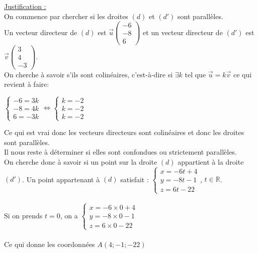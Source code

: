 \documentclass[a4paper, 12pt]{article}
\begin{document}
\noindent
\underline{Justification :}
\\
On commence par chercher si les droites $(d)$ et $(d')$ sont parallèles. 
\\[0.5mm]
Un vecteur directeur de $(d)$ est $\vec{u} \begin{pmatrix} -6 \\ -8 \\ 6 \end{pmatrix}$ et un vecteur directeur de $(d')$ est $\vec{v} \begin{pmatrix} 3 \\ 4 \\ -3 \end{pmatrix}$.
\\[4mm]
On cherche à savoir s'ils sont colinéaires, c'est-à-dire si $\exists k$ tel que $ \vec{u} = k\vec{v}$ ce qui revient à faire:
\begin{center}
$\begin{cases} -6 = 3k \\ -8 = 4k \\ 6 = -3k \end{cases} \iff \begin{cases} k = -2 \\ k = -2 \\ k = -2 \end{cases}$
\end{center}
Ce qui est vrai donc les vecteurs directeurs sont colinéaires et donc les droites sont parallèles. 
\\
Il nous reste à déterminer si elles sont confondues ou strictement parallèles.
\\
On cherche donc à savoir si un point sur la droite $(d)$ appartient à la droite $(d')$. Un point appartenant à $(d)$ satisfait : 
$ \begin{cases} x = -6t + 4 \\ y = -8t - 1 \\ z = 6t - 22 \end{cases}$, $t \in \mathds{R}$. 
\\ \\
Si on prends $t = 0$, on a $\begin{cases} x = -6 \times 0 + 4 \\ y = -8 \times 0 - 1 \\ z = 6 \times 0 -22 \end{cases}$ 
\\ \\ 
Ce qui donne les coordonnées $A(4; -1; -22)$ 
\\
\end{document}
